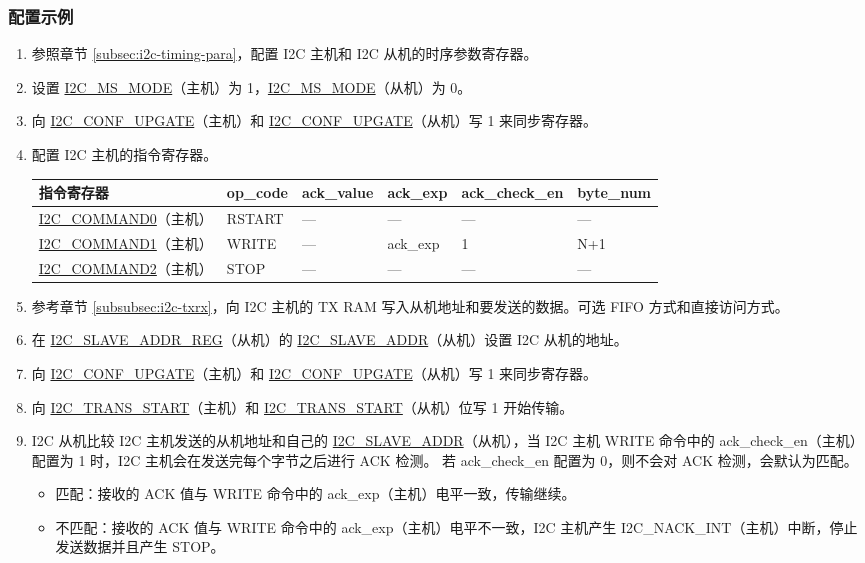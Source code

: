 \documentclass[main\_\_CN.tex]{subfiles}
\begin{document}
\subsubsection{配置示例}
\begin{enumerate}
\item 参照章节 \ref{subsec:i2c-timing-para}，配置 I2C 主机和 I2C 从机的时序参数寄存器。
\item 设置 \hyperref[fielddesc:I2CMSMODE]{I2C\_MS\_MODE}（主机）为 1，\hyperref[fielddesc:I2CMSMODE]{I2C\_MS\_MODE}（从机）为 0。
\item 向 \hyperref[fielddesc:I2CCONFUPGATE]{I2C\_CONF\_UPGATE}（主机）和 \hyperref[fielddesc:I2CCONFUPGATE]{I2C\_CONF\_UPGATE}（从机）写 1 来同步寄存器。
\item 配置 I2C 主机的指令寄存器。

\begin{longtable}{ | p{4cm} | p{2cm} | p{2cm} | p{2cm} |p{2cm} | p{2cm} |}
\hline\rowcolor{lightgray}
指令寄存器& op\_code & ack\_value&ack\_exp&ack\_check\_en&byte\_num  \\ \hline
\hyperref[fielddesc:I2CCOMMAND0]{I2C\_COMMAND0}（主机）& RSTART& ---&---&---&---  \\ \hline
\hyperref[fielddesc:I2CCOMMAND1]{I2C\_COMMAND1}（主机）& WRITE& ---&ack\_exp&1&N+1  \\ \hline
\hyperref[fielddesc:I2CCOMMAND2]{I2C\_COMMAND2}（主机）& STOP& ---&---&---&---  \\ \hline
\end{longtable}

\item 参考章节 \ref{subsubsec:i2c-txrx}，向 I2C 主机的 TX RAM 写入从机地址和要发送的数据。可选 FIFO 方式和直接访问方式。
\item 在 \hyperref[regdesc:I2CSLAVEADDRREG]{I2C\_SLAVE\_ADDR\_REG}（从机）的 \hyperref[fielddesc:I2CSLAVEADDR]{I2C\_SLAVE\_ADDR}（从机）设置 I2C 从机的地址。
\item 向 \hyperref[fielddesc:I2CCONFUPGATE]{I2C\_CONF\_UPGATE}（主机）和 \hyperref[fielddesc:I2CCONFUPGATE]{I2C\_CONF\_UPGATE}（从机）写 1 来同步寄存器。
\item 向 \hyperref[fielddesc:I2CTRANSSTART]{I2C\_TRANS\_START}（主机）和 \hyperref[fielddesc:I2CTRANSSTART]{I2C\_TRANS\_START}（从机）位写 1 开始传输。
\item I2C 从机比较 I2C 主机发送的从机地址和自己的 \hyperref[fielddesc:I2CSLAVEADDR]{I2C\_SLAVE\_ADDR}（从机），当 I2C 主机 WRITE 命令中的 ack\_check\_en（主机）配置为 1 时，I2C 主机会在发送完每个字节之后进行 ACK 检测。 若 ack\_check\_en 配置为 0，则不会对 ACK 检测，会默认为匹配。
\begin{itemize}
\item 匹配：接收的 ACK 值与 WRITE 命令中的 ack\_exp（主机）电平一致，传输继续。
\item 不匹配：接收的 ACK 值与 WRITE 命令中的 ack\_exp（主机）电平不一致，I2C 主机产生 I2C\_NACK\_INT（主机）中断，停止发送数据并且产生 STOP。
\end{itemize}


\end{enumerate}
\end{document}
